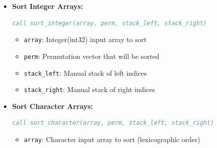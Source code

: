 \begin{enumerate}
\begin{enumerate}
\begin{itemize}
\begin{itemize}
                            \item \texttt{perm}: Permutation vector that will be sorted
                                  
                            \item \texttt{stack\_left}: Manual stack of left indices
                                  
                            \item \texttt{stack\_right}: Manual stack of right indices
                          \end{itemize}
                          
                    \item \textbf{Sort Integer Arrays:}
                          \begin{lstlisting}[language=Fortran]
call sort_integer(array, perm, stack_left, stack_right)
                          \end{lstlisting}
                          \begin{itemize}
                            \item \texttt{array}: Integer(int32) input array to sort
                                  
                            \item \texttt{perm}: Permutation vector that will be sorted
                                  
                            \item \texttt{stack\_left}: Manual stack of left indices
                                  
                            \item \texttt{stack\_right}: Manual stack of right indices
                          \end{itemize}
                          
                    \item \textbf{Sort Character Arrays:}
                          \begin{lstlisting}[language=Fortran]
call sort_character(array, perm, stack_left, stack_right)
                          \end{lstlisting}
                          \begin{itemize}
                            \item \texttt{array}: Character input array to sort (lexicographic
                                  order)
                                  

\end{itemize}
\end{itemize}
\end{enumerate}
\end{enumerate}
